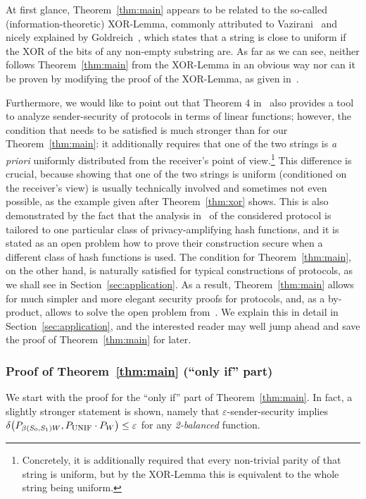 At first glance, Theorem~\ref{thm:main} appears to be related to the
so-called (information-theoretic) XOR-Lemma, commonly attributed to
Vazirani~\cite{Vazirani86} and nicely explained by
Goldreich~\cite{Goldreich95}, which states that a string is close to
uniform if the XOR of the bits of any non-empty substring are. As far
as we can see, neither follows Theorem~\ref{thm:main} from the
XOR-Lemma in an obvious way nor can it be proven by modifying the
proof of the XOR-Lemma, as given in~\cite{Goldreich95}.

Furthermore, we would like to point out that Theorem 4 in~\cite{BCW03} also
provides a tool to analyze sender-security of \OT 
protocols in terms of linear functions; however, the condition that
needs to be satisfied is much stronger than for our
Theorem~\ref{thm:main}: it additionally requires that one of the two
strings is {\em a priori} uniformly distributed from the receiver's
point of view.\footnote{Concretely, it is additionally required that
  every non-trivial parity of that string is uniform, but by the
  XOR-Lemma this is equivalent to the whole string being uniform. }
This difference is crucial, because showing that one of the
two strings is uniform (conditioned on the receiver's view) is usually
technically involved and sometimes not even possible, as the example
given after Theorem~\ref{thm:xor} shows. This is also demonstrated by
the fact that the analysis in~\cite{BCW03} of the considered \OT 
protocol is tailored to one particular class of privacy-amplifying
hash functions, and it is stated as an open problem how to prove their
construction secure when a different class of hash functions is used.
The condition for Theorem~\ref{thm:main}, on the other hand, is
naturally satisfied for typical constructions of \OT protocols, as we
shall see in Section~\ref{sec:application}. As a result,
Theorem~\ref{thm:main} allows for much simpler and more elegant
security proofs for \OT protocols, and, as a by-product, allows to
solve the open problem from~\cite{BCW03}. We explain this in detail in
Section~\ref{sec:application}, and the interested reader may well jump
ahead and save the proof of Theorem~\ref{thm:main} for later.


\subsubsection{Proof of Theorem~\ref{thm:main} (``only if'' part)}
\label{app:necessary}
We start with the proof for the ``only if'' part of
Theorem~\ref{thm:main}. In fact, a slightly stronger statement is
shown, namely that $\varepsilon$-sender-security implies
$\delta\big( P_{\beta(S_0,S_1) W} , P_{\mbox{\sc unif}} \cdot P_W \big) \leq \varepsilon$ for any
{\em 2-balanced} function. 

